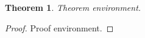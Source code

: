 \documentclass{article}
\newtheorem{thm}{Theorem}
\begin{document}
\begin{thm}
  Theorem environment.
\end{thm}

\begin{proof}
  Proof environment.
\end{proof}
\end{document}
